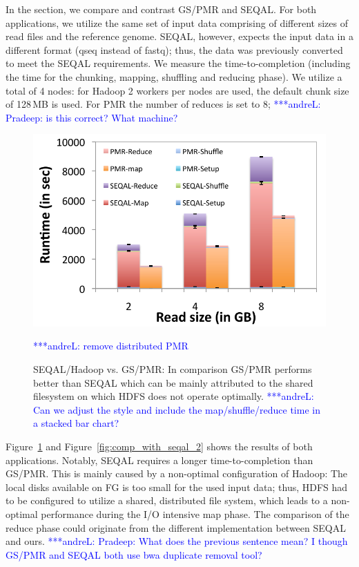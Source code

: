 \documentclass{acm_proc_article-sp}
\newcommand{\alnote}[1]{ {\textcolor{blue} { ***andreL: #1 }}}
\newcommand{\alnote}[1]{}
\begin{document}
In the section, we compare and contrast GS/PMR and SEQAL. For both
applications, we utilize the same set of input data comprising of different
sizes of read files and the reference genome. SEQAL, however, expects the 
input data in a different format (qseq instead of fastq); thus, the data was 
previously converted to meet the SEQAL requirements. We measure the
time-to-completion (including the time for the chunking, mapping, shuffling
and reducing phase). We utilize a total of 4 nodes: for Hadoop 2 workers per 
nodes are used, the default chunk size of 128\,MB is used. For PMR the number 
of reduces is set to 8; \alnote{Pradeep: is this correct? What machine?} 

\begin{figure}
 \centering
\includegraphics[scale=0.50]{figures/seqalvspmr.pdf}
\caption{SEQAL/Hadoop  vs. GS/PMR:  In comparison GS/PMR performs better than 
SEQAL which can be mainly attributed to the shared filesystem on which HDFS 
does not operate optimally.
\alnote{Can we adjust the style and include the map/shuffle/reduce time in a 
stacked bar chart?}}
\alnote{remove distributed PMR}
\label{fig:comp_with_seqal_1} 
\end{figure}



Figure~\ref{fig:comp_with_seqal_1} and Figure~\ref{fig:comp_with_seqal_2}
shows the results of both applications. Notably, SEQAL requires a longer
time-to-completion than GS/PMR. This is mainly caused by a non-optimal
configuration of Hadoop: The local disks available on FG is too small for the
used input data; thus, HDFS had to be configured to utilize a shared,
distributed file system, which leads to a non-optimal performance during the
I/O intensive map phase.  The comparison of the reduce phase could originate 
from the different implementation between SEQAL and ours. \alnote{Pradeep: 
What does the previous sentence mean? I though GS/PMR and SEQAL both use bwa 
duplicate removal tool?}
\end{document}
